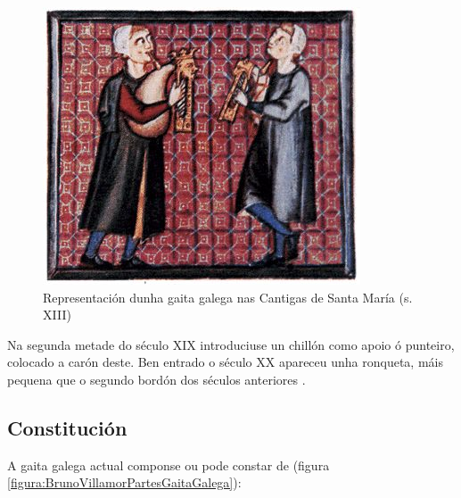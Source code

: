  \begin{figure}[htbp]
  \centering
  \includegraphics[scale=0.5,keepaspectratio=true]{./imagenes/cantigas-santa-maria-gaita-galega.jpg}
  \caption[Gaita galega nas Cantigas de Santa María]{Representación dunha gaita galega nas Cantigas de Santa María (s. XIII) \cite{WikipediaGaitaGalega}}
  \label{figura:CantigasSantaMariaGaitaGalega}
 \end{figure}

 Na segunda metade do século XIX introduciuse un chillón como apoio ó punteiro,
 colocado a carón deste. Ben entrado o século XX apareceu unha ronqueta, máis
 pequena que o segundo bordón dos séculos anteriores
 \cite{WikipediaGaitaGalega}.

 \subsection{Constitución}

 A gaita galega actual componse ou pode constar de \cite{WikipediaGaitaGalega}
 (figura \ref{figura:BrunoVillamorPartesGaitaGalega}):

